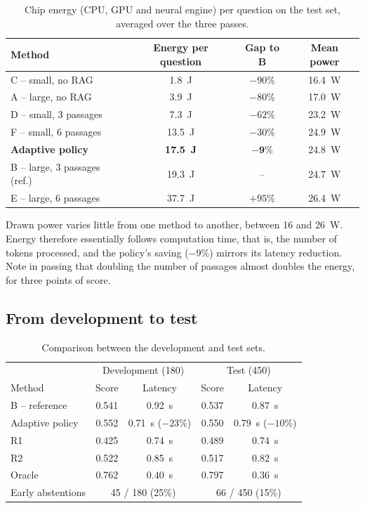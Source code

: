 \documentclass[11pt,a4paper]{article}
\begin{document}
\begin{table}[H]
\centering\small
\begin{tabular}{l c c c}
\toprule
Method & Energy per question & Gap to B & Mean power \\
\midrule
C -- small, no RAG & 1.8~J & $-90$\% & 16.4~W \\
A -- large, no RAG & 3.9~J & $-80$\% & 17.0~W \\
D -- small, 3 passages & 7.3~J & $-62$\% & 23.2~W \\
F -- small, 6 passages & 13.5~J & $-30$\% & 24.9~W \\
\textbf{Adaptive policy} & \textbf{17.5~J} & $\mathbf{-9}$\% & 24.8~W \\
B -- large, 3 passages (ref.) & 19.3~J & -- & 24.7~W \\
E -- large, 6 passages & 37.7~J & $+95$\% & 26.4~W \\
\bottomrule
\end{tabular}
\caption{Chip energy (CPU, GPU and neural engine) per question on the test set, averaged over the three
passes.}
\label{tab:energie}
\end{table}

Drawn power varies little from one method to another, between 16 and 26~W. Energy therefore essentially
follows computation time, that is, the number of tokens processed, and the policy's saving ($-9$\%)
mirrors its latency reduction. Note in passing that doubling the number of passages almost doubles the
energy, for three points of score.

\subsection{From development to test}

\begin{table}[H]
\centering\small
\begin{tabular}{l c c c c}
\toprule
& \multicolumn{2}{c}{Development (180)} & \multicolumn{2}{c}{Test (450)} \\
Method & Score & Latency & Score & Latency \\
\midrule
B -- reference & 0.541 & 0.92~s & 0.537 & 0.87~s \\
Adaptive policy & 0.552 & 0.71~s ($-23$\%) & 0.550 & 0.79~s ($-10$\%) \\
R1 & 0.425 & 0.74~s & 0.489 & 0.74~s \\
R2 & 0.522 & 0.85~s & 0.517 & 0.82~s \\
Oracle & 0.762 & 0.40~s & 0.797 & 0.36~s \\
\midrule
Early abstentions & \multicolumn{2}{c}{45 / 180 (25\%)} & \multicolumn{2}{c}{66 / 450 (15\%)} \\
\bottomrule
\end{tabular}
\caption{Comparison between the development and test sets.}
\label{tab:dev-test}
\end{table}
\end{document}
